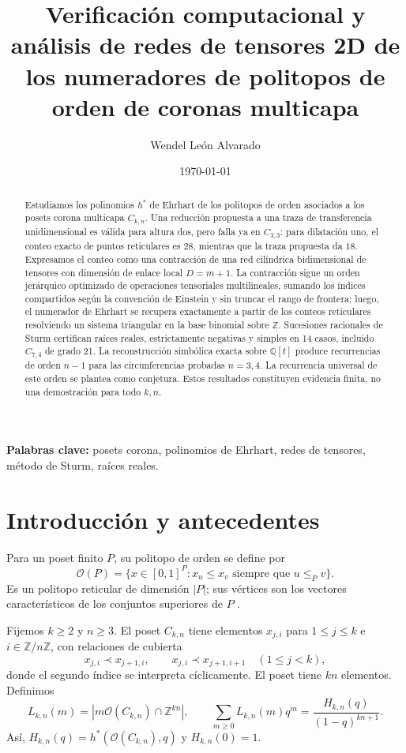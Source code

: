\documentclass[11pt,a4paper]{article}
\title{Verificación computacional y análisis de redes de tensores 2D de los numeradores de politopos de orden de coronas multicapa}
\author{Wendel León Alvarado}
\date{\today}
\theoremstyle{definition}
\begin{document}
\maketitle

\begin{abstract}
Estudiamos los polinomios $h^*$ de Ehrhart de los politopos de orden asociados a los posets corona multicapa $C_{k,n}$. Una reducción propuesta a una traza de transferencia unidimensional es válida para altura dos, pero falla ya en $C_{3,3}$: para dilatación uno, el conteo exacto de puntos reticulares es $28$, mientras que la traza propuesta da $18$. Expresamos el conteo como una contracción de una red cilíndrica bidimensional de tensores con dimensión de enlace local $D=m+1$. La contracción sigue un orden jerárquico optimizado de operaciones tensoriales multilineales, sumando los índices compartidos según la convención de Einstein y sin truncar el rango de frontera; luego, el numerador de Ehrhart se recupera exactamente a partir de los conteos reticulares resolviendo un sistema triangular en la base binomial sobre $\mathbb{Z}$. Sucesiones racionales de Sturm certifican raíces reales, estrictamente negativas y simples en 14 casos, incluido $C_{7,4}$ de grado 21. La reconstrucción simbólica exacta sobre $\mathbb{Q}[t]$ produce recurrencias de orden $n-1$ para las circunferencias probadas $n=3,4$. La recurrencia universal de este orden se plantea como conjetura. Estos resultados constituyen evidencia finita, no una demostración para todo $k,n$.
\end{abstract}

\small\noindent\textbf{Palabras clave:} posets corona, polinomios de Ehrhart, redes de tensores, método de Sturm, raíces reales.
\normalsize

\section{Introducción y antecedentes}

Para un poset finito $P$, su politopo de orden se define por
\[
\mathcal{O}(P)=\{x\in[0,1]^P:x_u\le x_v\text{ siempre que }u\le_P v\}.
\]
Es un politopo reticular de dimensión $|P|$; sus vértices son los vectores característicos de los conjuntos superiores de $P$ \cite{Stanley1986}.

Fijemos $k\ge2$ y $n\ge3$. El poset $C_{k,n}$ tiene elementos $x_{j,i}$ para $1\le j\le k$ e $i\in\mathbb Z/n\mathbb Z$, con relaciones de cubierta
\[
x_{j,i}\prec x_{j+1,i},\qquad x_{j,i}\prec x_{j+1,i+1}\quad (1\le j<k),
\]
donde el segundo índice se interpreta cíclicamente. El poset tiene $kn$ elementos. Definimos
\[
L_{k,n}(m)=|m\mathcal{O}(C_{k,n})\cap\mathbb Z^{kn}|,\qquad
\sum_{m\ge0}L_{k,n}(m)q^m=\frac{H_{k,n}(q)}{(1-q)^{kn+1}}.
\]
Así, $H_{k,n}(q)=h^*(\mathcal{O}(C_{k,n}),q)$ y $H_{k,n}(0)=1$.
\end{document}
